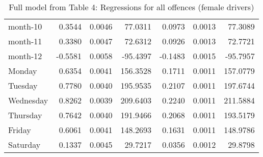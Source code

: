 \documentclass[10pt]{article}
\begin{document}
\begin{table}[ht]
\begin{tabular}{lrrrrrr}
  month-10 & 0.3544 & 0.0046 & 77.0311 & 0.0973 & 0.0013 & 77.3089 \\ 
  month-11 & 0.3380 & 0.0047 & 72.6312 & 0.0926 & 0.0013 & 72.7721 \\ 
  month-12 & -0.5581 & 0.0058 & -95.4397 & -0.1483 & 0.0015 & -95.7957 \\ 
  Monday & 0.6354 & 0.0041 & 156.3528 & 0.1711 & 0.0011 & 157.0779 \\ 
  Tuesday & 0.7780 & 0.0040 & 195.9535 & 0.2107 & 0.0011 & 197.6744 \\ 
  Wednesday & 0.8262 & 0.0039 & 209.6403 & 0.2240 & 0.0011 & 211.5884 \\ 
  Thursday & 0.7642 & 0.0040 & 191.9466 & 0.2068 & 0.0011 & 193.5179 \\ 
  Friday & 0.6061 & 0.0041 & 148.2693 & 0.1631 & 0.0011 & 148.9786 \\ 
  Saturday & 0.1337 & 0.0045 & 29.7217 & 0.0356 & 0.0012 & 29.8798 \\ 
   \hline
\end{tabular}
\caption{Full model from Table 4: Regressions for all offences (female drivers)} 
\label{tab_4_all_pts_no_age_F}
\end{table}


\clearpage
\pagebreak



\end{document}
